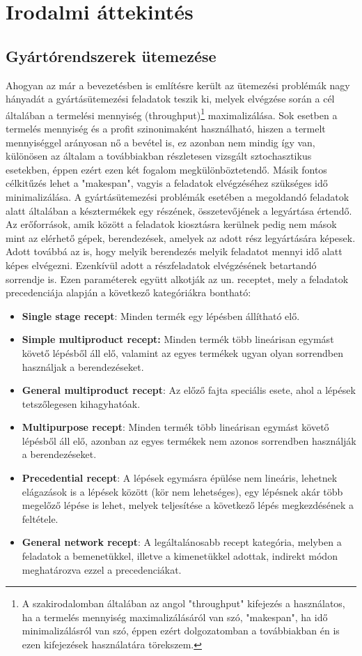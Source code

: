 \chapter{Irodalmi áttekintés} \label{Research}     
\section{Gyártórendszerek ütemezése}
Ahogyan az már a bevezetésben is említésre került az ütemezési problémák nagy hányadát a gyártásütemezési feladatok teszik ki, melyek elvégzése során a cél általában a termelési mennyiség (throughput)\footnote{A szakirodalomban általában az angol "throughput" kifejezés a használatos, ha a termelés mennyiség maximalizálásáról van szó, "makespan", ha idő minimalizálásról van szó, éppen ezért dolgozatomban a továbbiakban én is ezen kifejezések használatára törekszem.} maximalizálása.
Sok esetben a termelés mennyiség és a profit szinonimaként használható, hiszen a termelt mennyiséggel arányosan nő a bevétel is, ez azonban nem mindig így van, különösen az általam a továbbiakban részletesen vizsgált sztochasztikus esetekben, éppen ezért ezen két fogalom megkülönböztetendő.
Másik fontos célkitűzés lehet a "makespan", vagyis a feladatok elvégzéséhez szükséges idő minimalizálása.
A gyártásütemezési problémák esetében a megoldandó feladatok alatt általában a késztermékek egy részének, összetevőjének a legyártása értendő.
Az erőforrások, amik között a feladatok kiosztásra kerülnek pedig nem mások mint az elérhető gépek, berendezések, amelyek az adott rész legyártására képesek. 
Adott továbbá az is, hogy melyik berendezés melyik feladatot mennyi idő alatt képes elvégezni.
Ezenkívül adott a részfeladatok elvégzésének betartandó sorrendje is.
Ezen paraméterek együtt alkotják az un. receptet, mely a feladatok precedenciája alapján a következő kategóriákra bontható:
\begin{itemize}
\item[]\textbf{Single stage recept}: Minden termék egy lépésben állítható elő. 
\item[]\textbf{Simple multiproduct recept:} Minden termék több lineárisan egymást követő lépésből áll elő, valamint az egyes termékek ugyan olyan sorrendben használjak a berendezéseket.
\item[]\textbf{General multiproduct recept}: Az előző fajta speciális esete, ahol a lépések tetszőlegesen kihagyhatóak.
\item[]\textbf{Multipurpose recept}: Minden termék több lineárisan egymást követő lépésből áll elő, azonban az egyes termékek nem azonos sorrendben használják a berendezéseket.
\item[]\textbf{Precedential recept}: A lépések egymásra épülése nem lineáris, lehetnek elágazások is a lépések között (kör nem lehetséges), egy lépésnek akár több megelőző lépése is lehet, melyek teljesítése a következő lépés megkezdésének a feltétele.
\item[]\textbf{General network recept}: A legáltalánosabb recept kategória, melyben a feladatok a bemenetükkel, illetve a kimenetükkel adottak, indirekt módon meghatározva ezzel a precedenciákat.\cite{hegyhati2010} 
\end{itemize}
